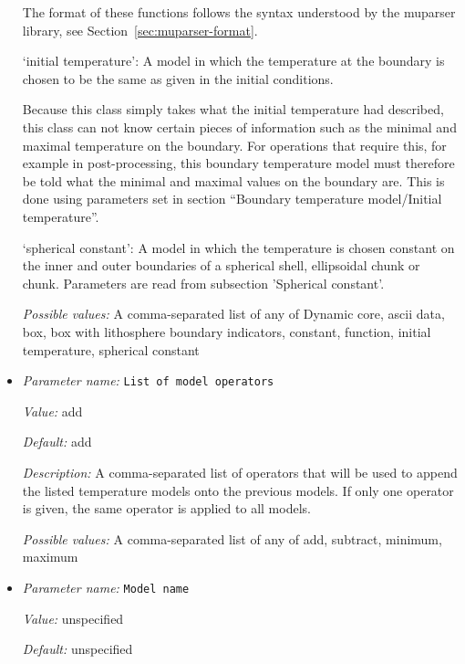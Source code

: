 \begin{itemize}
The format of these functions follows the syntax understood by the muparser library, see Section~\ref{sec:muparser-format}.

`initial temperature': A model in which the temperature at the boundary is chosen to be the same as given in the initial conditions.

Because this class simply takes what the initial temperature had described, this class can not know certain pieces of information such as the minimal and maximal temperature on the boundary. For operations that require this, for example in post-processing, this boundary temperature model must therefore be told what the minimal and maximal values on the boundary are. This is done using parameters set in section ``Boundary temperature model/Initial temperature''.

`spherical constant': A model in which the temperature is chosen constant on the inner and outer boundaries of a spherical shell, ellipsoidal chunk or chunk. Parameters are read from subsection 'Spherical constant'.


{\it Possible values:} A comma-separated list of any of Dynamic core, ascii data, box, box with lithosphere boundary indicators, constant, function, initial temperature, spherical constant
\item {\it Parameter name:} {\tt List of model operators}
\label{parameters:Boundary temperature model/List of model operators}
\label{parameters:Boundary_20temperature_20model/List_20of_20model_20operators}


{\it Value:} add


{\it Default:} add


{\it Description:} A comma-separated list of operators that will be used to append the listed temperature models onto the previous models. If only one operator is given, the same operator is applied to all models.


{\it Possible values:} A comma-separated list of any of add, subtract, minimum, maximum
\item {\it Parameter name:} {\tt Model name}
\label{parameters:Boundary temperature model/Model name}
\label{parameters:Boundary_20temperature_20model/Model_20name}


{\it Value:} unspecified


{\it Default:} unspecified



\end{itemize}
